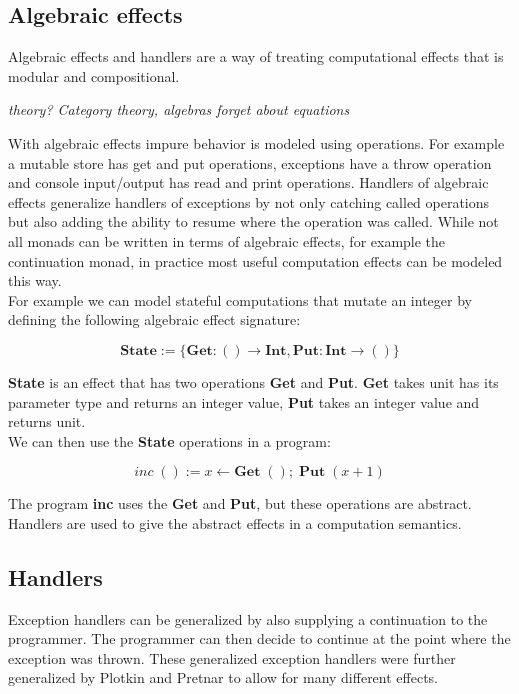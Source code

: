 \subsection{Algebraic effects}

Algebraic effects and handlers are a way of treating computational effects that is modular and compositional.

\textit{
theory?
Category theory, algebras
forget about equations
}

With algebraic effects impure behavior is modeled using operations.
For example a mutable store has get and put operations, exceptions have a throw operation and console input/output has read and print operations.
Handlers of algebraic effects generalize handlers of exceptions by not only catching called operations but also adding the ability to resume where the operation was called.
While not all monads can be written in terms of algebraic effects, for example the continuation monad, in practice most useful computation effects can be modeled this way.
\\
For example we can model stateful computations that mutate an integer by defining the following algebraic effect signature:

\[ \textbf{State} := \{ \textbf{Get} : () \rightarrow \textbf{Int}, \textbf{Put} : \textbf{Int} \rightarrow () \} \]

\textbf{State} is an effect that has two operations \textbf{Get} and \textbf{Put}. \textbf{Get} takes unit has its parameter type and returns an integer value, \textbf{Put} takes an integer value and returns unit.
\\
We can then use the \textbf{State} operations in a program:

\[ \textit{inc} \; () := x \leftarrow \textbf{Get} \; () ;\; \textbf{Put} \; (x + 1) \]

The program \textbf{inc} uses the \textbf{Get} and \textbf{Put}, but these operations are abstract.
Handlers are used to give the abstract effects in a computation semantics.

\subsection{Handlers}

Exception handlers can be generalized by also supplying a continuation to the programmer.
The programmer can then decide to continue at the point where the exception was thrown.
These generalized exception handlers were further generalized by Plotkin and Pretnar to allow for many different effects.

